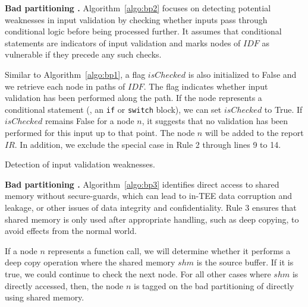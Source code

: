 \textbf{Bad partitioning .} 
Algorithm~\ref{algo:bp2} focuses on detecting potential weaknesses in input validation by checking whether inputs pass through conditional logic before being processed further.
It assumes that conditional statements are indicators of input validation and marks nodes of $IDF$ as vulnerable if they precede any such checks.

Similar to Algorithm~\ref{algo:bp1}, a flag $isChecked$ is also initialized to False and we retrieve each node in paths of $IDF$. The flag indicates whether input validation has been performed along the path.
If the node represents a conditional statement (\eg, an \texttt{if} or \texttt{switch} block), we can set $isChecked$ to True. If $isChecked$ remains False for a node $n$, it suggests that no validation has been performed for this input up to that point. The node $n$ will be added to the report $IR$.
In addition, we exclude the special case in Rule 2 through lines 9 to 14.

\begin{algorithm}[t]
\caption{Detection of input validation weaknesses.}
\label{algo:bp2}
\end{algorithm}

\textbf{Bad partitioning .} 
Algorithm~\ref{algo:bp3} identifies direct access to shared memory without secure-guards, which can lead to in-TEE data corruption and leakage, or other issues of data integrity and confidentiality.
Rule 3 ensures that shared memory is only used after appropriate handling, such as deep copying, to avoid effects from the normal world.

If a node $n$ represents a function call, we will determine whether it performs a deep copy operation where the shared memory $shm$ is the source buffer.
If it is true, we could continue to check the next node.
For all other cases where $shm$ is directly accessed, then, the node $n$ is tagged on the bad partitioning of directly using shared memory.

